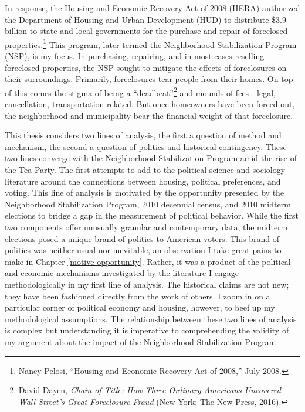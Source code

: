 \documentclass[12pt,oneside]{psthesis}
\begin{document}
In response, the Housing and Economic Recovery Act of 2008 (HERA) authorized the Department of Housing and Urban Development (HUD) to distribute \$3.9 billion to state and local governments for the purchase and repair of foreclosed properties.\footnote{Nancy Pelosi, ``Housing and Economic Recovery Act of 2008,'' July 2008.}
This program, later termed the Neighborhood Stabilization Program (NSP), is my focus.
In purchasing, repairing, and in most cases reselling foreclosed properties, the NSP sought to mitigate the effects of foreclosures on their surroundings.
Primarily, foreclosures tear people from their homes.
On top of this comes the stigma of being a ``deadbeat''\footnote{David Dayen, \emph{Chain of Title: How Three Ordinary Americans Uncovered Wall Street's Great Foreclosure Fraud} (New York: The New Press, 2016).} and mounds of fees---legal, cancellation, transportation-related.
But once homeowners have been forced out, the neighborhood and municipality bear the financial weight of that foreclosure.

This thesis considers two lines of analysis, the first a question of method and mechanism, the second a question of politics and historical contingency.
These two lines converge with the Neighborhood Stabilization Program amid the rise of the Tea Party.
The first attempts to add to the political science and sociology literature around the connections between housing, political preferences, and voting.
This line of analysis is motivated by the opportunity presented by the Neighborhood Stabilization Program, 2010 decennial census, and 2010 midterm elections to bridge a gap in the measurement of political behavior.
While the first two components offer unusually granular and contemporary data, the midterm elections posed a unique brand of politics to American voters.
This brand of politics was neither usual nor inevitable, an observation I take great pains to make in Chapter \ref{motive-opportunity}.
Rather, it was a product of the political and economic mechanisms investigated by the literature I engage methodologically in my first line of analysis.
The historical claims are not new; they have been fashioned directly from the work of others.
I zoom in on a particular corner of political economy and housing, however, to beef up my methodological assumptions.
The relationship between these two lines of analysis is complex but understanding it is imperative to comprehending the validity of my argument about the impact of the Neighborhood Stabilization Program.
\end{document}
